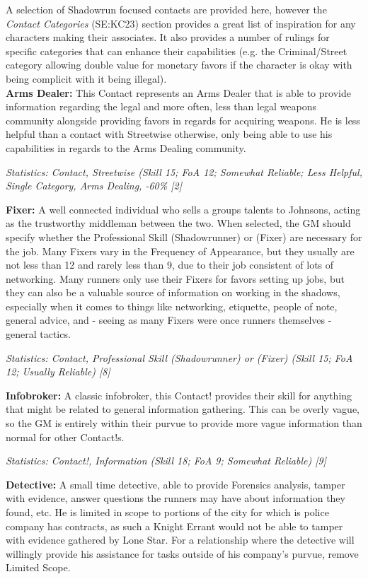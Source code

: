 \begin{multicols}{2}
	A selection of Shadowrun focused contacts are provided here, however the \textit{Contact Categories} (SE:KC23) section provides a great list of inspiration for any characters making their associates. It also provides a number of rulings for specific categories that can enhance their capabilities (e.g. the Criminal/Street category allowing double value for monetary favors if the character is okay with being complicit with it being illegal).\\
	
	\textbf{Arms Dealer:} This Contact represents an Arms Dealer that is able to provide information regarding the legal and more often, less than legal weapons community alongside providing favors in regards for acquiring weapons. He is less helpful than a contact with Streetwise otherwise, only being able to use his capabilities in regards to the Arms Dealing community.
	
	\textit{\textcolor{OliveGreen}{Statistics: Contact, Streetwise (Skill 15; FoA 12; Somewhat Reliable; Less Helpful, Single Category, Arms Dealing, -60\% [2]}}
	
	\textbf{Fixer:} A well connected individual who sells a groups talents to Johnsons, acting as the trustworthy middleman between the two. When selected, the GM should specify whether the Professional Skill (Shadowrunner) or (Fixer) are necessary for the job. Many Fixers vary in the Frequency of Appearance, but they usually are not less than 12 and rarely less than 9, due to their job consistent of lots of networking. Many runners only use their Fixers for favors setting up jobs, but they can also be a valuable source of information on working in the shadows, especially when it comes to things like networking, etiquette, people of note, general advice, and - seeing as many Fixers were once runners themselves - general tactics.
	
	\textit{\textcolor{OliveGreen}{Statistics: Contact, Professional Skill (Shadowrunner) or (Fixer) (Skill 15; FoA 12; Usually Reliable) [8]}}
	
	\textbf{Infobroker:} A classic infobroker, this Contact! provides their skill for anything that might be related to general information gathering. This can be overly vague, so the GM is entirely within their purvue to provide more vague information than normal for other Contact!s.
	
	\textit{\textcolor{OliveGreen}{Statistics: Contact!, Information (Skill 18; FoA 9; Somewhat Reliable) [9]}}
	
	\textbf{Detective:} A small time detective, able to provide Forensics analysis, tamper with evidence, answer questions the runners may have about information they found, etc. He is limited in scope to portions of the city for which is police company has contracts, as such a Knight Errant would not be able to tamper with evidence gathered by Lone Star. For a relationship where the detective will willingly provide his assistance for tasks outside of his company's purvue, remove Limited Scope.
	

\end{multicols}
